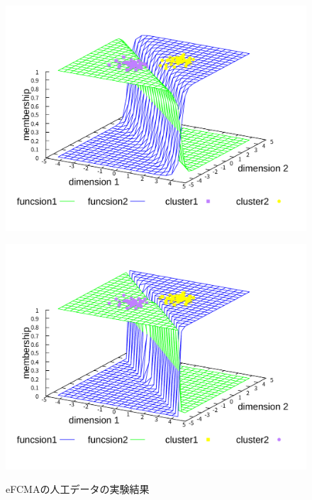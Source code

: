 \documentclass[twocolumn, a4paper]{icethesisabst}
\begin{document}
\begin{figure}[htbp]
 \centering
 \begin{minipage}{0.4\hsize}
  \includegraphics[width=\linewidth]{eFCMA-Lambda1.pdf}
  \label{fig:eFCMA-Lambda1}
 \end{minipage}
 \begin{minipage}{0.4\hsize}
  \includegraphics[width=\linewidth]{eFCMA-Lambda10.pdf}
  \label{fig:eFCMA-Lambda10}
 \end{minipage}
 \vspace*{0.2cm}
 \caption{eFCMAの人工データの実験結果}
 \label{fig:eFCMA}
\end{figure}
\end{document}
